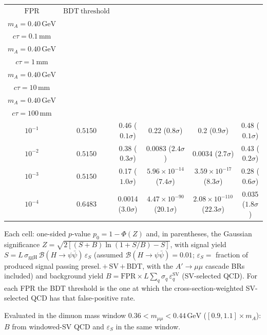 \documentclass[10pt,a4paper]{article}
\begin{document}
{\begin{tabular}{cccccc}
\toprule
$\mathrm{FPR}$ & $\mathrm{BDT\ threshold}$ & \shortstack{$m_{\pi}=4\,\mathrm{GeV}$\\$m_{A}=0.40\,\mathrm{GeV}$\\$c\tau=0.1\,\mathrm{mm}$} & \shortstack{$m_{\pi}=4\,\mathrm{GeV}$\\$m_{A}=0.40\,\mathrm{GeV}$\\$c\tau=1\,\mathrm{mm}$} & \shortstack{$m_{\pi}=4\,\mathrm{GeV}$\\$m_{A}=0.40\,\mathrm{GeV}$\\$c\tau=10\,\mathrm{mm}$} & \shortstack{$m_{\pi}=4\,\mathrm{GeV}$\\$m_{A}=0.40\,\mathrm{GeV}$\\$c\tau=100\,\mathrm{mm}$} \\
\midrule
$10^{-1}$ & $0.5150$ & 0.46 ($0.1\sigma$) & 0.22 ($0.8\sigma$) & 0.2 ($0.9\sigma$) & 0.48 ($0.1\sigma$)\\
$10^{-2}$ & $0.5150$ & 0.38 ($0.3\sigma$) & 0.0083 ($2.4\sigma$) & 0.0034 ($2.7\sigma$) & 0.43 ($0.2\sigma$)\\
$10^{-3}$ & $0.5150$ & 0.17 ($1.0\sigma$) & $5.96\times10^{-14}$ ($7.4\sigma$) & $3.59\times10^{-17}$ ($8.3\sigma$) & 0.28 ($0.6\sigma$)\\
$10^{-4}$ & $0.6483$ & 0.0014 ($3.0\sigma$) & $4.47\times10^{-90}$ ($20.1\sigma$) & $2.08\times10^{-110}$ ($22.3\sigma$) & 0.035 ($1.8\sigma$)\\
\bottomrule
\end{tabular}

{\small Each cell: one-sided $p$-value $p_0=1-\Phi(Z)$ and, in parentheses, the Gaussian significance $Z=\sqrt{2\left[(S{+}B)\ln(1{+}S/B)-S\right]}$, with signal yield $S=L\,\sigma_{\mathrm{ggH}}\,\mathcal{B}(H\to\psi\bar{\psi})\,\varepsilon_S$ (assumed $\mathcal{B}(H\to\psi\bar{\psi})=0.01$; $\varepsilon_S=$ fraction of produced signal passing presel.\,$+$\,SV\,$+$\,BDT, with the $A'\to\mu\mu$ cascade BRs included) and background yield $B=\mathrm{FPR}\times L\sum_q\sigma_q\,\varepsilon_q^{\mathrm{SV}}$ (SV-selected QCD). For each FPR the BDT threshold is the one at which the cross-section-weighted SV-selected QCD has that false-positive rate.}

{\small Evaluated in the dimuon mass window $0.36<m_{\mu\mu}<0.44\,\mathrm{GeV}$ ($[0.9,1.1]\times m_A$): $B$ from windowed-SV QCD and $\varepsilon_S$ in the same window.}

}\clearpage
\end{document}
